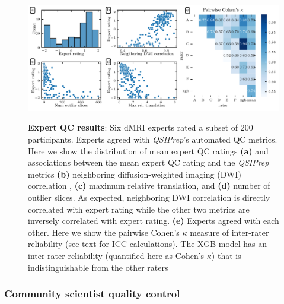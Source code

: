 \documentclass[fleqn,10pt,inline]{wlscirep}
\begin{document}
\begin{figure}[tbp]
    {\label{fig:expert-qc:scatter:hist}}
    {\label{fig:expert-qc:scatter:ndc}}
    {\label{fig:expert-qc:scatter:translation}}
    {\label{fig:expert-qc:scatter:outliers}}
    {\label{fig:expert-qc:irr}}
    \centering
    \includegraphics[width=\linewidth]{community-qc/expert_qc.pdf}
    \caption{%
        {\bf Expert QC results}:
        Six dMRI experts rated a subset of \num{200} participants.  Experts agreed
        with \emph{QSIPrep}'s automated QC metrics.  Here we show the
        distribution of mean expert QC ratings \textbf{(a)} and associations
        between the mean expert QC rating and the \emph{QSIPrep} metrics
        \textbf{(b)} neighboring diffusion-weighted imaging (DWI) correlation 
        \cite{yeh2019-kb}, \textbf{(c)} maximum relative translation, and
        \textbf{(d)} number of outlier slices. As expected, neighboring DWI correlation is directly
        correlated with expert rating while the other two metrics are inversely
        correlated with expert rating.
        \textbf{(e)} Experts agreed with each other. Here we show the pairwise
        Cohen's $\kappa$ measure of inter-rater reliability (see text for ICC
        calculations). The XGB model has an inter-rater reliability (quantified
        here as Cohen's $\kappa$) that is indistinguishable from the other
        raters
    }
    \label{fig:expert-qc}
\end{figure}

\subsubsection*{Community scientist quality control}
\end{document}
